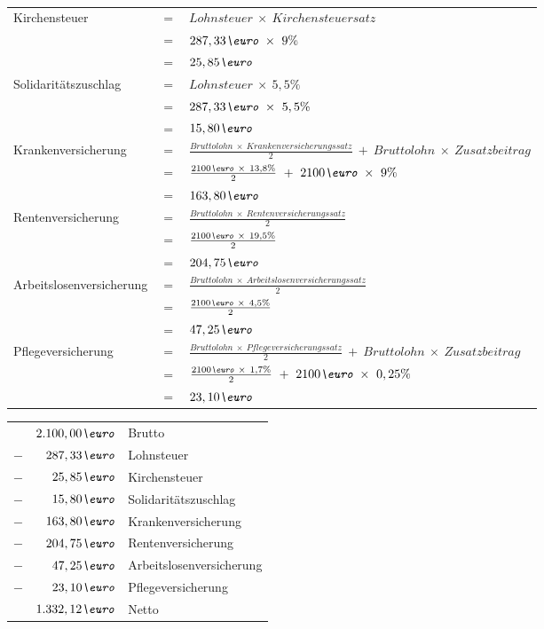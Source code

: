 \\
\begin{table}[!h]
\small
\begin{tabular}{lll}
Kirchensteuer				& $=$ & $Lohnsteuer\ \times\ Kirchensteuersatz$\\
							& $=$ & $287,33\textit{\euro}\ \times\ 9\% $\\
							& $=$ & $25,85\textit{\euro}$\\
Solidaritätszuschlag	 		& $=$ & $Lohnsteuer\ \times\ 5,5\%$\\
							& $=$ & $287,33\textit{\euro}\ \times\ 5,5\%$\\
							& $=$ & $15,80\textit{\euro}$\\
Krankenversicherung			& $=$ & $\frac{Bruttolohn\ \times\ Krankenversicherungssatz}{2}\ +\ Bruttolohn\ \times\ Zusatzbeitrag$\\
							& $=$ & $\frac{2100\textit{\euro}\ \times\ 13,8\%}{2}\ +\ 2100\textit{\euro}\ \times\ 9\%$\\
							& $=$ & $163,80\textit{\euro}$\\
Rentenversicherung			& $=$ & $\frac{Bruttolohn\ \times\ Rentenversicherungssatz}{2}$\\
							& $=$ & $\frac{2100\textit{\euro}\ \times\ 19,5\%}{2}$\\
							& $=$ & $204,75\textit{\euro}$\\
Arbeitslosenversicherung		& $=$ & $\frac{Bruttolohn\ \times\ Arbeitslosenversicherungssatz}{2}$\\
							& $=$ & $\frac{2100\textit{\euro}\ \times\ 4,5\%}{2}$\\
							& $=$ & $47,25\textit{\euro}$\\
Pflegeversicherung			& $=$ & $\frac{Bruttolohn\ \times\ Pflegeversicherungssatz}{2}\ +\ Bruttolohn\ \times\ Zusatzbeitrag$\\
							& $=$ & $\frac{2100\textit{\euro}\ \times\ 1,7\%}{2}\ +\ 2100\textit{\euro}\ \times\ 0,25\%$\\
							& $=$ & $23,10\textit{\euro}$\\
\end{tabular}
\end{table}

\begin{tabular}{lrl}
& $2.100,00\textit{\euro}$ & Brutto\\
$-$ & $287,33\textit{\euro}$ & Lohnsteuer\\
$-$ & $25,85\textit{\euro}$ & Kirchensteuer\\ 
$-$ & $15,80\textit{\euro}$ & Solidaritätszuschlag\\
$-$ & $163,80\textit{\euro}$ & Krankenversicherung\\
$-$ & $204,75\textit{\euro}$ & Rentenversicherung\\
$-$ & $47,25\textit{\euro}$ & Arbeitslosenversicherung\\
$-$ & $23,10\textit{\euro}$ & Pflegeversicherung\\
\hline
& $1.332,12\textit{\euro}$ & Netto\\
\end{tabular}


